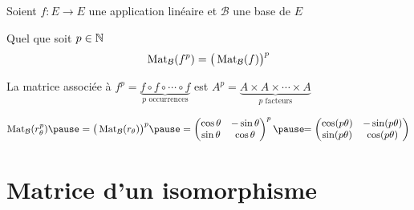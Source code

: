\begin{frame}

\begin{corollaire}
Soient $f :  E \to E$ une application linéaire et $\mathcal{B}$ une base de $E$

Quel que soit $p \in \mathbb{N}$
$$\mathop{\text{Mat}}\nolimits_{\mathcal{B}} (f^p) = \big( \mathop{\text{Mat}}\nolimits_{\mathcal{B}} (f) \big)^p$$
\end{corollaire}

\pause
\bigskip

La matrice associée à $f^p = \underbrace{f \circ f \circ\cdots \circ f}_{p \text{ occurrences}} $
est $A^p = \underbrace{A \times A \times \cdots \times A}_{p \text{ facteurs}}$

\bigskip
\pause

\begin{exemple}
\vspace*{-2ex}
$$\Mat_{\mathcal{B}} (r_\theta^p) 
\pause= \big( \Mat_{\mathcal{B}} (r_\theta) \big)^p
\pause=  \begin{pmatrix}
\cos\theta & -\sin\theta\\
\sin\theta & \cos\theta
\end{pmatrix}^p
\pause \!\!= \begin{pmatrix}
\cos(p\theta) & -\sin(p\theta)\\
\sin(p\theta) & \cos(p\theta)
\end{pmatrix}$$
\end{exemple}
\end{frame}


\section{Matrice d'un isomorphisme}

